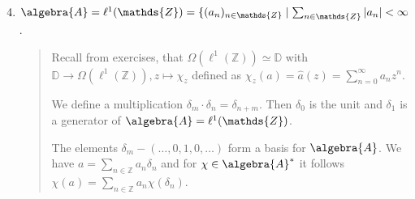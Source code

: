 \documentclass[a4paper]{article}
\begin{document}
\begin{example}~
	\begin{enumerate}
		\setcounter{enumi}{3}
		\item $\algebra{A} = \ell^1(\mathds{Z}) = \{ (a_n)_{n \in \mathds{Z}} \mid \sum_{n \in \mathds{Z}} |a_n| < \infty$.
		      \begin{quote}
			      Recall from exercises, that $\Omega(\ell^1(\mathds{Z})) \simeq \mathds{D}$ with $\mathds{D} \to \Omega(\ell^1(\mathds{Z})), z \mapsto \chi_z$ defined as $\chi_z(a) = \hat a (z) = \sum_{n=0}^{\infty}a_n z^n$.

			      We define a multiplication $\delta_m \cdot \delta_n = \delta_{n + m}$. Then $\delta_0$ is the unit and $\delta_1$ is a generator of $\algebra{A} = \ell^1(\mathds{Z})$.

			      The elements $\delta_m - (\dots, 0, 1, 0, \dots )$ form a basis for $\algebra{A}$.
			      We have $a = \sum_{n \in \mathds{Z}} a_n \delta_n$ and for $\chi \in \algebra{A}^*$ it follows $\chi(a) = \sum_{n \in \mathds{Z}} a_n \chi(\delta_n)$.
		      \end{quote}


\end{enumerate}
\end{example}
\end{document}
